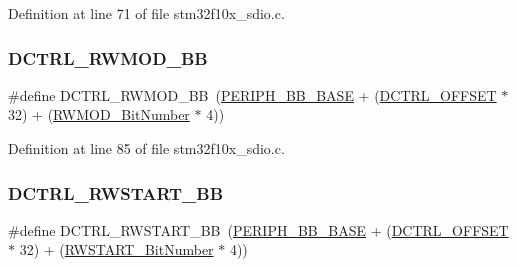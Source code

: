 Definition at line 71 of file stm32f10x\+\_\+sdio.\+c.

\mbox{\label{group___s_d_i_o___private___types_definitions_gad34bfe8650534ce24320ae83886c91e3}} 
\subsubsection{\texorpdfstring{D\+C\+T\+R\+L\+\_\+\+R\+W\+M\+O\+D\+\_\+\+BB}{DCTRL\_RWMOD\_BB}}
{\footnotesize\ttfamily \#define D\+C\+T\+R\+L\+\_\+\+R\+W\+M\+O\+D\+\_\+\+BB~(\hyperlink{group___peripheral__memory__map_gaed7efc100877000845c236ccdc9e144a}{P\+E\+R\+I\+P\+H\+\_\+\+B\+B\+\_\+\+B\+A\+SE} + (\hyperlink{group___s_d_i_o___private___types_definitions_ga948c1382c4cfd3af3e406c4d0cdd4240}{D\+C\+T\+R\+L\+\_\+\+O\+F\+F\+S\+ET} $\ast$ 32) + (\hyperlink{group___s_d_i_o___private___types_definitions_gad7b722671f65e79d1be2899b643278ad}{R\+W\+M\+O\+D\+\_\+\+Bit\+Number} $\ast$ 4))}



Definition at line 85 of file stm32f10x\+\_\+sdio.\+c.

\mbox{\label{group___s_d_i_o___private___types_definitions_gac776c39dfac0e1ed007217133e1145c3}} 
\subsubsection{\texorpdfstring{D\+C\+T\+R\+L\+\_\+\+R\+W\+S\+T\+A\+R\+T\+\_\+\+BB}{DCTRL\_RWSTART\_BB}}
{\footnotesize\ttfamily \#define D\+C\+T\+R\+L\+\_\+\+R\+W\+S\+T\+A\+R\+T\+\_\+\+BB~(\hyperlink{group___peripheral__memory__map_gaed7efc100877000845c236ccdc9e144a}{P\+E\+R\+I\+P\+H\+\_\+\+B\+B\+\_\+\+B\+A\+SE} + (\hyperlink{group___s_d_i_o___private___types_definitions_ga948c1382c4cfd3af3e406c4d0cdd4240}{D\+C\+T\+R\+L\+\_\+\+O\+F\+F\+S\+ET} $\ast$ 32) + (\hyperlink{group___s_d_i_o___private___types_definitions_ga773045c51d3e8daee0c181517c44a2df}{R\+W\+S\+T\+A\+R\+T\+\_\+\+Bit\+Number} $\ast$ 4))}



